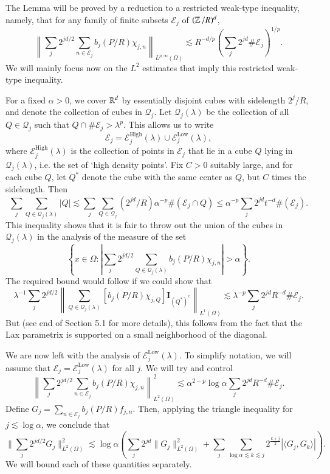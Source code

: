 The Lemma will be proved by a reduction to a restricted weak-type inequality, namely, that for any family of finite subsets $\mathcal{E}_j$ of $(\operatorname{\mathbb{Z}} / R)^d$, 
%
\[ \left\| \sum_j 2^{jd/2} \sum_{n \in \mathcal{E}_j} b_j(P/R) \chi_{j,n} \right\|_{L^{p,\infty}(\Omega)} \lesssim R^{-d/p} \left( \sum_j 2^{jd} \# \mathcal{E}_j \right)^{1/p}. \]
%
We will mainly focus now on the $L^2$ estimates that imply this restricted weak-type inequality.

For a fixed $\alpha > 0$, we cover $\operatorname{\mathbb{R}}^d$ by essentially disjoint cubes with sidelength $2^j / R$, and denote the collection of cubes in $\mathcal{Q}_j$. Let $\mathcal{Q}_j(\lambda)$ be the collection of all $Q \in \mathcal{Q}_j$ such that $Q \cap \# \mathcal{E}_j > \lambda^p$. This allows us to write
%
\[ \mathcal{E}_j = \mathcal{E}^{\text{High}}_j(\lambda) \cup \mathcal{E}^{\text{Low}}_j(\lambda), \]
%
where $\mathcal{E}^{\text{High}}_j(\lambda)$ is the collection of points in $\mathcal{E}_j$ that lie in a cube $Q$ lying in $\mathcal{Q}_j(\lambda)$, i.e. the set of `high density points'. Fix $C > 0$ suitably large, and for each cube $Q$, let $Q^*$ denote the cube with the same center as $Q$, but $C$ times the sidelength. Then
%
\[ \sum_j \sum_{Q \in \mathcal{Q}_j(\lambda)} |Q| \lesssim \sum_j \sum_{Q \in \mathcal{Q}_j} (2^{jd} / R) \alpha^{-p} \#( \mathcal{E}_j \cap Q ) \leq \alpha^{-p} \sum_j 2^{jd} t^{-d} \#(\mathcal{E}_j). \]
%
This inequality shows that it is fair to throw out the union of the cubes in $\mathcal{Q}_j(\lambda)$ in the analysis of the measure of the set
%
\[ \left\{ x \in \Omega : \left| \sum_j 2^{jd/2} \sum_{Q \in \mathcal{Q}_j(\lambda)} b_j(P/R) \chi_{j,n} \right| > \alpha \right\}. \]
%
The required bound would follow if we could show that
%
\[ \lambda^{-1} \sum_j 2^{jd/2} \left\| \sum_{Q \in \mathcal{Q}_j(\lambda)} [ b_j(P/R) \chi_{j,Q} ] \mathbf{I}_{(Q^*)^c} \right\|_{L^1(\Omega)} \lesssim \lambda^{-p} \sum_j 2^{jd} R^{-d} \# \mathcal{E}_j. \]
%
But (see end of Section 5.1 for more details), this follows from the fact that the Lax parametrix is supported on a small neighborhood of the diagonal.

We are now left with the analysis of $\mathcal{E}_j^{\text{Low}}(\lambda)$. To simplify notation, we will assume that $\mathcal{E}_j = \mathcal{E}_j^{\text{Low}}(\lambda)$ for all $j$. We will try and control
%
\[ \left\| \sum_j 2^{jd/2} \sum_{n \in \mathcal{E}_j} b_j(P/R) \chi_{j,n} \right\|_{L^2(\Omega)}^2 \lesssim \alpha^{2 - p} \log \alpha \sum_j 2^{jd} R^{-d} \# \mathcal{E}_j. \]
%
Define $G_j = \sum_{n \in \mathcal{E}_j} b_j(P/R) f_{j,n}$. Then, applying the triangle inequality for $j \lesssim \log \alpha$, we conclude that
%
\[ \| \sum_j 2^{jd/2} G_j \|_{L^2(\Omega)}^2 \lesssim \log \alpha \left( \sum_j 2^{jd} \| G_j \|_{L^2(\Omega)}^2 + \sum_j \sum_{\log \alpha \lesssim k \lesssim j} 2^{ \frac{k+j}{2} } |\langle G_j, G_k \rangle| \right). \]
%
We will bound each of these quantities separately.

